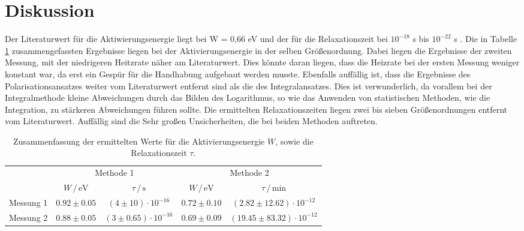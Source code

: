 \newpage
\section{Diskussion}
\label{sec:Diskussion}
Der Literaturwert für die Aktiwierungsenergie liegt bei W = 0,66 eV und der für die Relaxationszeit bei $10^{-18}$ s bis $10^{-22}$ s \cite{muccillo}.
Die in Tabelle \ref{tab:ergebnisse} zusammengefassten Ergebnisse liegen bei der Aktivierungsenergie in der selben Größenordnung.
Dabei liegen die Ergebnisse der zweiten Messung, mit der niedrigeren Heitzrate näher am Literaturwert. 
Dies könnte daran liegen, dass die Heizrate bei der ersten Messung weniger konstant war, da erst ein Gespür für die Handhabung aufgebaut werden musste.
Ebenfalls auffällig ist, dass die Ergebnisse des Polarisationsansatzes weiter vom Literaturwert entfernt sind als die des Integralansatzes.
Dies ist verwunderlich, da vorallem bei der Integralmethode kleine Abweichungen durch das Bilden des Logarithmus, so wie das Anwenden von statistischen Methoden, wie die Integration, zu stärkeren Abweichungen führen sollte.
Die ermittelten Relaxationszeiten liegen zwei bis sieben Größenordnungen entfernt vom Literaturwert.
Auffällig sind die Sehr großen Unsicherheiten, die bei beiden Methoden auftreten.


\begin{table}[h]
    \centering
    \caption{Zusammenfassung der ermittelten Werte für die Aktivierungsenergie $W$, sowie die Relaxationszeit $\tau$.}
    \label{tab:ergebnisse}
    \begin{tabular}{c c c c c}
      \toprule
      &\multicolumn{2}{c}{Methode 1} &\multicolumn{2}{c}{Methode 2}\\
      \cmidrule(lr){2-3}\cmidrule(lr){4-5}
                   &$W \, / \, \si{\electronvolt}$  &$\tau \, / \, \si{\second}$ & $W \, / \, \si{\electronvolt}$    & $\tau \, / \, \si{\minute}$   \\
      \midrule
      Messung 1    & $0.92 \pm 0.05$              & $(4 \pm 10) \cdot 10^{-16}$    & $0.72 \pm 0.10$                 & $(2.82 \pm 12.62) \cdot 10^{-12}$  \\   
      Messung 2    & $0.88 \pm 0.05$              & $(3 \pm 0.65) \cdot 10^{-16}$  & $0.69 \pm 0.09$                 & $(19.45 \pm 83.32) \cdot 10^{-12}$  \\   
      \bottomrule
    \end{tabular}
  \end{table}